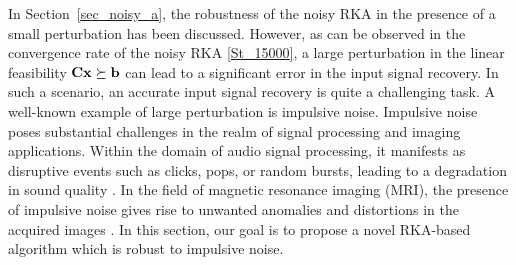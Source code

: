 \documentclass[12pt,draftcls,onecolumn]{IEEEtran}
\newcommand{\Fr}[1]{\textcolor{blue}{#1}}
\begin{document}
In Section~\ref{sec_noisy_a}, the robustness of the noisy RKA in the presence of a small perturbation has been discussed. However, as can be observed in the convergence rate of the noisy RKA \eqref{St_15000}, a large perturbation in the linear feasibility $\mathbf{C}\mathbf{x}\succeq\mathbf{b}$ can lead to a significant error in the input signal recovery. In such a scenario, an accurate input signal recovery is quite a challenging task. A well-known example of large perturbation is impulsive noise. Impulsive noise poses substantial challenges in the realm of signal processing and imaging applications. Within the domain of audio signal processing, it manifests as disruptive events such as clicks, pops, or random bursts, leading to a degradation in sound quality \cite{oudre2015automatic,nongpiur2008impulse}. In the field of magnetic resonance imaging (MRI), the presence of impulsive noise gives rise to unwanted anomalies and distortions in the acquired images \cite{pham2011improved}. In this section, our goal is to propose a novel RKA-based algorithm which is robust to impulsive noise.
\end{document}
